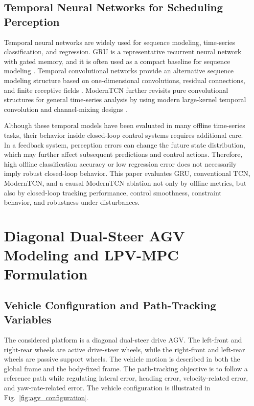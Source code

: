 \documentclass{ieeeaccess}
\newcommand{\citep}[1]{\cite{#1}}
\begin{document}
\subsection{Temporal Neural Networks for Scheduling Perception}



Temporal neural networks are widely used for sequence modeling, time-series classification, and regression. GRU is a representative recurrent neural network with gated memory, and it is often used as a compact baseline for sequence modeling \citep{}. Temporal convolutional networks provide an alternative sequence modeling structure based on one-dimensional convolutions, residual connections, and finite receptive fields \citep{}. ModernTCN further revisits pure convolutional structures for general time-series analysis by using modern large-kernel temporal convolution and channel-mixing designs \citep{}.



Although these temporal models have been evaluated in many offline time-series tasks, their behavior inside closed-loop control systems requires additional care. In a feedback system, perception errors can change the future state distribution, which may further affect subsequent predictions and control actions. Therefore, high offline classification accuracy or low regression error does not necessarily imply robust closed-loop behavior. This paper evaluates GRU, conventional TCN, ModernTCN, and a causal ModernTCN ablation not only by offline metrics, but also by closed-loop tracking performance, control smoothness, constraint behavior, and robustness under disturbances.



\section{Diagonal Dual-Steer AGV Modeling and LPV-MPC Formulation}

\label{sec:model_lpv_mpc}



\subsection{Vehicle Configuration and Path-Tracking Variables}



The considered platform is a diagonal dual-steer drive AGV. The left-front and right-rear wheels are active drive-steer wheels, while the right-front and left-rear wheels are passive support wheels. The vehicle motion is described in both the global frame and the body-fixed frame. The path-tracking objective is to follow a reference path while regulating lateral error, heading error, velocity-related error, and yaw-rate-related error. The vehicle configuration is illustrated in Fig.~\ref{fig:agv_configuration}.
\end{document}
